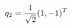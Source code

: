 \documentclass[preview]{standalone}
\begin{document}
\begin{align*}
\special{dvisvgm:raw <g id='unique000'>}q_2=\dfrac{1}{\sqrt2}(1,-1)^T\special{dvisvgm:raw </g>}
\end{align*}
\end{document}
